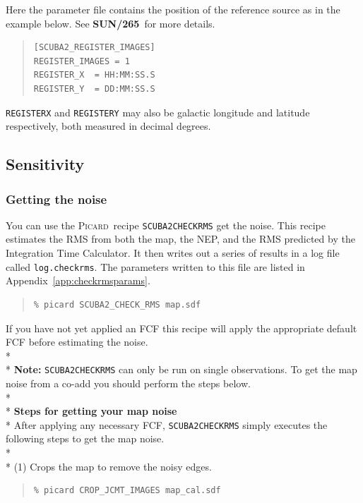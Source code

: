 \documentclass[twoside,11pt]{article}
\newcommand{\htmlref}[2]{#1}
\newcommand{\latexhtml}[2]{#1}
\newcommand{\xref}[3]{#1}
\newcommand{\xlabel}[1]{}
\renewcommand{\_}{\texttt{\symbol{95}}}
\newenvironment{myquote}{
   \color{MidnightBlue}\begin{quote}\begin{small}}{
   \end{small}\end{quote}
}
\newcommand{\picard}{\xref{\textsc{Picard}}{sun265}{}}
\newcommand{\drrecipe}[1]{\texttt{#1}}
\newcommand{\param}[1]{\texttt{#1}}
\newcommand{\file}[1]{\texttt{#1}}
\newcommand{\picardsun}{\xref{\textbf{SUN/265}}{sun265}{}}
\newcommand{\cref}[3]{\latexhtml{#1~\ref{#2}}{\htmlref{#3}{#2}}}
\renewenvironment{myquote}{
      \begin{quote}\begin{small}}{
      \end{small}\end{quote}
   }
\begin{document}
Here the parameter file contains the position of the reference source
as in the example below. See \picardsun\ for more details.
\begin{center}
\begin{quote}
\begin{verbatim}
[SCUBA2_REGISTER_IMAGES]
REGISTER_IMAGES = 1
REGISTER_X  = HH:MM:SS.S
REGISTER_Y  = DD:MM:SS.S
\end{verbatim}
\end{quote}
\end{center}

\param{REGISTER\_X} and \param{REGISTER\_Y} may also be galactic
longitude and latitude respectively, both measured in decimal
degrees.

\subsection{\xlabel{noise}Sensitivity}

\subsubsection{Getting the noise}
\label{sec:checkrms}

You can use the \picard\ recipe \drrecipe{SCUBA2\_CHECK\_RMS} get the
noise. This recipe estimates the RMS from both the map, the NEP, and
the RMS predicted by the Integration Time Calculator. It then writes out
a series of results in a log file called \file{log.checkrms}. The
parameters written to this file are listed in
\cref{Appendix}{app:checkrmsparams}{SCUBA2_CHECK_RMS}.

\begin{myquote}
\begin{verbatim}
% picard SCUBA2_CHECK_RMS map.sdf
\end{verbatim}
\end{myquote}
If you have not yet applied an FCF this recipe will apply the
appropriate default FCF before estimating the noise.
\\*\\*
\textbf{Note:} \drrecipe{SCUBA2\_CHECK\_RMS} can only be run on single
observations. To get the map noise from a co-add you should perform the steps below.
\\*\\*
\textbf{Steps for getting your map noise}\\*
After applying any necessary FCF, \drrecipe{SCUBA2\_CHECK\_RMS} simply executes
the following steps to get the map noise.
\\*\\*
(1) Crops the map to remove the noisy edges.
\begin{myquote}
\begin{verbatim}
% picard CROP_JCMT_IMAGES map_cal.sdf
\end{verbatim}
\end{myquote}
\end{document}
